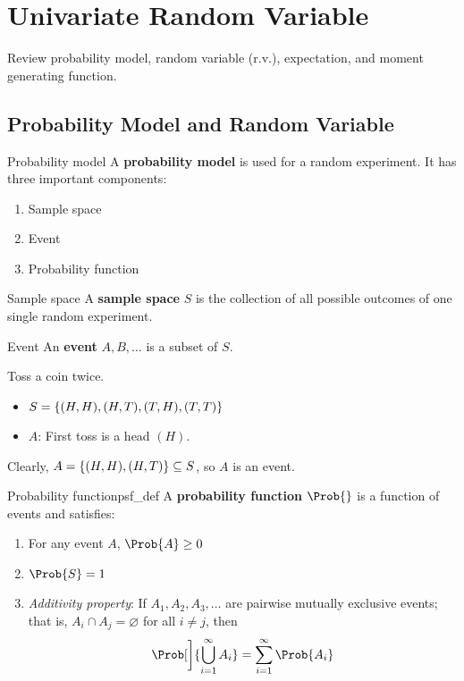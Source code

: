 \setcounter{chapter}{1}
\chapter{Univariate Random Variable}
Review probability model, random variable (r.v.),
expectation, and moment generating function.

\section{Probability Model and Random Variable}
\begin{Definition}{Probability model}{}
    A \textbf{probability model} is used for a random
    experiment. It has three important components:
    \begin{enumerate}[label=(\Roman*)]
        \item Sample space
        \item Event
        \item Probability function
    \end{enumerate}
\end{Definition}

\begin{Definition}{Sample space}{}
    A \textbf{sample space} $ S $ is
    the collection of all possible outcomes of one single
    random experiment.
\end{Definition}
\begin{Definition}{Event}{}
    An \textbf{event} $ A,B,\ldots $ is a subset of $ S $.
\end{Definition}

\begin{Example}{}{}
    Toss a coin twice.
    \begin{itemize}
        \item $ S=\{(H,H),(H,T),(T,H),(T,T)\} $
        \item $ A $: First toss is a head $ (H) $.
    \end{itemize}
    Clearly, $ A=\{(H,H),(H,T)\}\subseteq S $, so $ A $ is an event.
\end{Example}

\begin{Definition}{Probability function}{psf_def}
    A \textbf{probability function} $ \Prob{} $
    is a function of events and satisfies:
    \begin{enumerate}[label=(\Roman*)]
        \item\label{psf_def_1} For any event $ A $, $ \Prob{A}\ge 0 $
        \item\label{psf_def_2} $ \Prob{S}=1 $
        \item\label{psf_def_3} \emph{Additivity property}: If $ A_1,A_2,A_3,\ldots $
              are pairwise mutually exclusive events; that is, $ A_i\cap A_j=\varnothing $
              for all $ i\neq j $, then
              \[ \Prob[\bigg]{\bigcup_{i=1}^{\infty}A_i}=\sum\limits_{i=1}^{\infty} \Prob{A_i} \]
    \end{enumerate}
\end{Definition}


